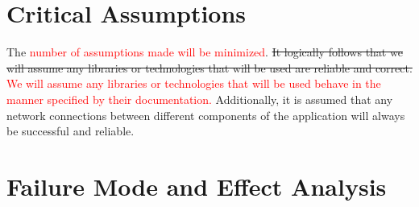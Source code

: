 \documentclass{article}
\begin{document}
\section{Critical Assumptions}

The \textcolor{red}{number of assumptions made will be minimized}. \sout{It logically follows that we will assume any libraries or technologies that will be used are reliable and correct.} \textcolor{red}{We will assume any libraries or technologies that will be used behave in the manner specified by their documentation.} Additionally, it is assumed that any network connections between different components of the application will always be successful and reliable.

\section{Failure Mode and Effect Analysis}
\end{document}

